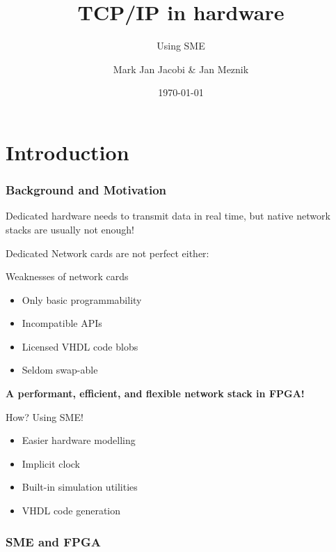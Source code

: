 \documentclass{beamer}
\title{TCP/IP in hardware }
\subtitle{Using SME}
\author{Mark Jan Jacobi \& Jan Meznik}
\institute{University of Copenhagen}
\date{\today}
\begin{document}
\frame{\titlepage}

\section{Introduction}
\begin{frame}
  \frametitle{Background and Motivation}

  Dedicated hardware needs to transmit data in real time, but native network 
  stacks are usually not enough!

  Dedicated Network cards are not perfect either:
  \begin{alertblock}{Weaknesses of network cards}
    \begin{itemize}
      \item Only basic programmability
      \item Incompatible APIs 
      \item Licensed VHDL code blobs
      \item Seldom swap-able
    \end{itemize}
  \end{alertblock}
\end{frame}

\begin{frame}
\begin{center}
  \textbf{A performant, efficient, and flexible network stack in FPGA!}
\end{center}

\begin{block}{How?    Using SME!}
  \begin{itemize}
    \item Easier hardware modelling
    \item Implicit clock
    \item Built-in simulation utilities 
    \item VHDL code generation
  \end{itemize}
\end{block}

\end{frame}

\begin{frame}
  \frametitle{SME and FPGA}

\end{frame}
\end{document}
